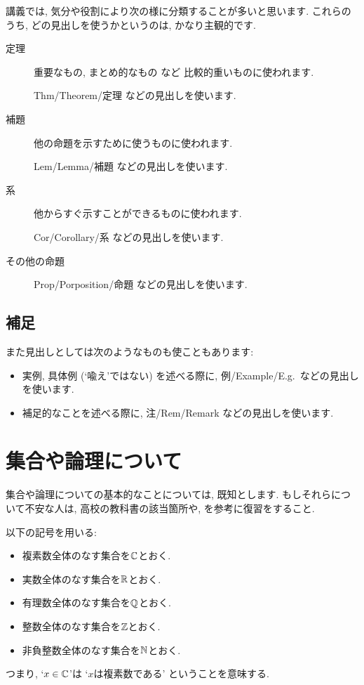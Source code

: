講義では, 
気分や役割により次の様に分類することが多いと思います.
これらのうち, どの見出しを使うかというのは, 
かなり主観的です.
\begin{description}
\item[定理]
重要なもの, まとめ的なもの など 比較的重いものに使われます.

Thm/Theorem/定理  などの見出しを使います.

\item[補題]
他の命題を示すために使うものに使われます.

Lem/Lemma/補題  などの見出しを使います.

\item[系]
他からすぐ示すことができるものに使われます.

Cor/Corollary/系  などの見出しを使います.
\item[その他の命題]

Prop/Porposition/命題  などの見出しを使います.
\end{description}

\subsection{補足}
また見出しとしては次のようなものも使こともあります:
\begin{itemize}
 \item 
実例, 具体例 (`喩え'ではない) を述べる際に,
例/Example/E.g.\   などの見出しを使います.
\item
補足的なことを述べる際に,
注/Rem/Remark   などの見出しを使います.
\end{itemize}

\section{集合や論理について}

集合や論理についての基本的なことについては,
既知とします.
もしそれらについて不安な人は,
高校の教科書の該当箇所や,
\cite{978-4-535-78682-0}
を参考に復習をすること.


以下の記号を用いる:
\begin{itemize}
\item 複素数全体のなす集合を$\mathbb{C}$とおく.
\item 実数全体のなす集合を$\mathbb{R}$とおく.
\item 有理数全体のなす集合を$\mathbb{Q}$とおく.
\item 整数全体のなす集合を$\mathbb{Z}$とおく.
\item 非負整数全体のなす集合を$\mathbb{N}$とおく.
\end{itemize}
つまり,
`$x\in\mathbb{C}$'は
`$x$は複素数である'
ということを意味する.

